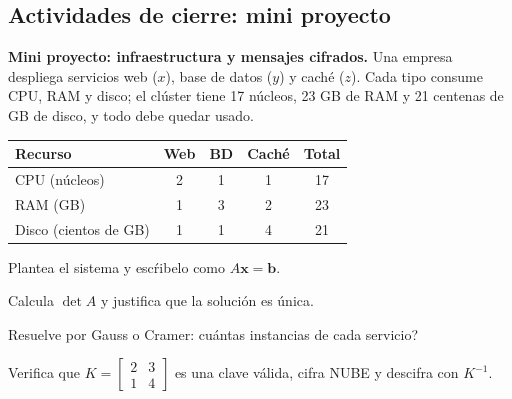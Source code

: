 \subsection{Actividades de cierre: mini proyecto}
\begin{tmsistemas}
\textbf{Mini proyecto: infraestructura y mensajes cifrados.} Una empresa despliega servicios web ($x$), base de datos ($y$) y cach\'e ($z$). Cada tipo consume CPU, RAM y disco; el cl\'uster tiene 17 n\'ucleos, 23 GB de RAM y 21 centenas de GB de disco, y todo debe quedar usado.
\end{tmsistemas}

\begin{center}
\begin{tabular}{|l|c|c|c|c|}
\hline
\rowcolor{tmAzulClaro}\textbf{Recurso} & \textbf{Web} & \textbf{BD} & \textbf{Cach\'e} & \textbf{Total}\\ \hline
CPU (n\'ucleos) & 2 & 1 & 1 & 17\\ \hline
RAM (GB) & 1 & 3 & 2 & 23\\ \hline
Disco (cientos de GB) & 1 & 1 & 4 & 21\\ \hline
\end{tabular}
\end{center}

\begin{tmlista}
\item Plantea el sistema y esc\'ribelo como $A\mathbf x=\mathbf b$.
\item Calcula $\det A$ y justifica que la soluci\'on es \'unica.
\item Resuelve por Gauss o Cramer: \textquestiondown cu\'antas instancias de cada servicio?
\item Verifica que $K=\begin{bmatrix}2&3\\1&4\end{bmatrix}$ es una clave v\'alida, cifra NUBE y descifra con $K^{-1}$.
\end{tmlista}


